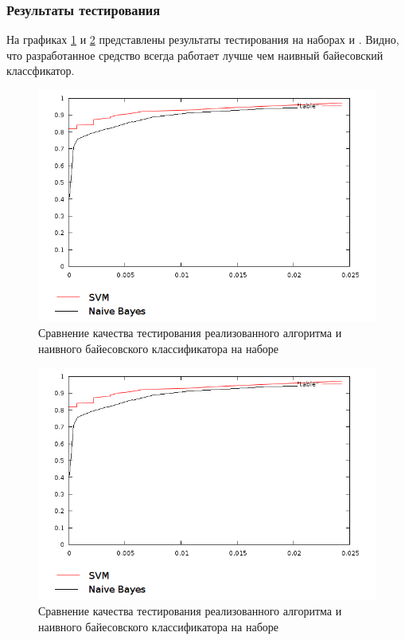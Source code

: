 \subsubsection{Результаты тестирования}
На графиках \ref{SAPCBAYESSVM} и \ref{CEASBAYESSVM} представлены результаты тестирования на наборах \cite{SAPC} и \cite{CEAS}. Видно, что разработанное средство всегда работает лучше чем наивный байесовский классфикатор.

\begin{figure}[h]
\begin{center}
\includegraphics[width=15cm]{img/graphic}
\end{center}
\caption{Сравнение качества тестирования реализованного алгоритма и наивного байесовского классификатора на наборе \cite{SAPC}}
\label{SAPCBAYESSVM}
\end{figure}

\begin{figure}[h]
\begin{center}
\includegraphics[width=15cm]{img/graphic}
\end{center}
\caption{Сравнение качества тестирования реализованного алгоритма и наивного байесовского классификатора на наборе \cite{SAPC}}
\label{CEASBAYESSVM}
\end{figure}

